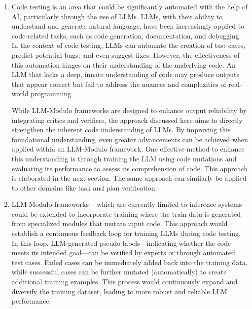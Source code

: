\documentclass[11pt]{article}
\begin{document}
\begin{enumerate}[label=(\alph*),leftmargin=*]
    \item Code testing is an area that could be significantly automated with the help of AI, particularly through the use of LLMs. LLMs, with their ability to understand and generate natural language, have been increasingly applied to code-related tasks, such as code generation, documentation, and debugging. In the context of code testing, LLMs can automate the creation of test cases, predict potential bugs, and even suggest fixes. However, the effectiveness of this automation hinges on their understanding of the underlying code. An LLM that lacks a deep, innate understanding of code may produce outputs that appear correct but fail to address the nuances and complexities of real-world programming. 
    
   While LLM-Modulo frameworks are designed to enhance output reliability by integrating critics and verifiers, the approach discussed here aims to directly strengthen the inherent code understanding of LLMs. By improving this foundational understanding, even greater advancements can be achieved when applied within an LLM-Modulo framework. One effective method to enhance this understanding is through training the LLM using code mutations and evaluating its performance to assess its comprehension of code. This approach is elaborated in the next section. The same approach can similarly be applied to other domains like task and plan verification.
    
    \item LLM-Modulo frameworks -- which are currently limited to inference systems -- could be extended to incorporate training where the train data is generated from specialized modules that mutate input code. This approach would establish a continuous feedback loop for training LLMs during code testing. In this loop, LLM-generated pseudo labels—indicating whether the code meets its intended goal—can be verified by experts or through automated test cases. Failed cases can be immediately added back into the training data, while successful cases can be further mutated (automatically) to create additional training examples. This process would continuously expand and diversify the training dataset, leading to more robust and reliable LLM performance.
\end{enumerate}



\printbibliography
\end{document}
